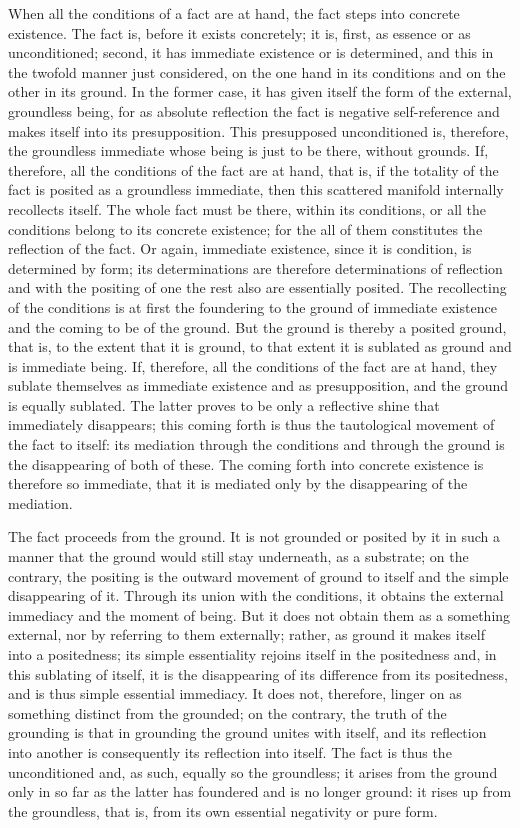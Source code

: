 When all the conditions of a fact are at hand,
the fact steps into concrete existence.
The fact is, before it exists concretely;
it is, first, as essence or as unconditioned;
second, it has immediate existence or is determined,
and this in the twofold manner just considered,
on the one hand in its conditions
and on the other in its ground.
In the former case, it has given itself the form
of the external, groundless being,
for as absolute reflection the fact is
negative self-reference and makes itself into its presupposition.
This presupposed unconditioned is, therefore, the groundless immediate
whose being is just to be there, without grounds.
If, therefore, all the conditions of the fact are at hand,
that is, if the totality of the fact is posited as a groundless immediate,
then this scattered manifold internally recollects itself.
The whole fact must be there, within its conditions,
or all the conditions belong to its concrete existence;
for the all of them constitutes the reflection of the fact.
Or again, immediate existence, since it is condition, is determined by form;
its determinations are therefore determinations of reflection
and with the positing of one the rest also are essentially posited.
The recollecting of the conditions is at first
the foundering to the ground of immediate existence
and the coming to be of the ground.
But the ground is thereby a posited ground, that is,
to the extent that it is ground,
to that extent it is sublated as ground
and is immediate being.
If, therefore, all the conditions of the fact are at hand,
they sublate themselves as immediate existence and as presupposition,
and the ground is equally sublated.
The latter proves to be only a reflective shine
that immediately disappears;
this coming forth is thus the tautological movement
of the fact to itself:
its mediation through the conditions and through the ground
is the disappearing of both of these.
The coming forth into concrete existence is therefore so immediate,
that it is mediated only by the disappearing of the mediation.

The fact proceeds from the ground.
It is not grounded or posited by it
in such a manner that the ground
would still stay underneath, as a substrate;
on the contrary, the positing is
the outward movement of ground to itself
and the simple disappearing of it.
Through its union with the conditions,
it obtains the external immediacy and the moment of being.
But it does not obtain them as a something external,
nor by referring to them externally;
rather, as ground it makes itself into a positedness;
its simple essentiality rejoins itself in the positedness
and, in this sublating of itself,
it is the disappearing of its difference from its positedness,
and is thus simple essential immediacy.
It does not, therefore, linger on
as something distinct from the grounded;
on the contrary, the truth of the grounding is
that in grounding the ground unites with itself,
and its reflection into another is
consequently its reflection into itself.
The fact is thus the unconditioned
and, as such, equally so the groundless;
it arises from the ground only in so far as
the latter has foundered and is no longer ground:
it rises up from the groundless, that is,
from its own essential negativity or pure form.

